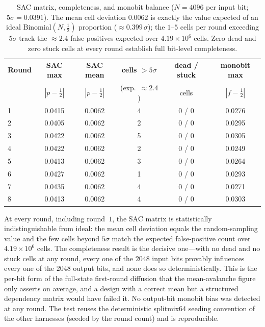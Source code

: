 \documentclass[11pt,a4paper]{article}
\begin{document}
\begin{table}[h]
\centering
\renewcommand{\arraystretch}{1.2}
\begin{tabular}{lccccc}
  \toprule
  \textbf{Round} & \textbf{SAC max} & \textbf{SAC mean} &
  \textbf{cells $>5\sigma$} & \textbf{dead / stuck} & \textbf{monobit max} \\
   & $|p{-}\tfrac12|$ & $|p{-}\tfrac12|$ & (exp.\ ${\approx}2.4$) & cells & $|f{-}\tfrac12|$ \\
  \midrule
  1 & 0.0415 & 0.0062 & 4 & 0 / 0 & 0.0276 \\
  2 & 0.0405 & 0.0062 & 2 & 0 / 0 & 0.0295 \\
  3 & 0.0422 & 0.0062 & 5 & 0 / 0 & 0.0305 \\
  4 & 0.0422 & 0.0062 & 2 & 0 / 0 & 0.0249 \\
  5 & 0.0413 & 0.0062 & 3 & 0 / 0 & 0.0264 \\
  6 & 0.0427 & 0.0062 & 1 & 0 / 0 & 0.0293 \\
  7 & 0.0435 & 0.0062 & 4 & 0 / 0 & 0.0271 \\
  8 & 0.0413 & 0.0062 & 4 & 0 / 0 & 0.0303 \\
  \bottomrule
\end{tabular}
\caption{SAC matrix, completeness, and monobit balance ($N=4096$ per input bit;
$5\sigma=0.0391$). The mean cell deviation $0.0062$ is exactly the value expected
of an ideal $\mathrm{Binomial}(N,\tfrac12)$ proportion ($\approx0.399\,\sigma$);
the $1$--$5$ cells per round exceeding $5\sigma$ track the $\approx2.4$ false
positives expected over $4.19\times10^{6}$ cells. Zero dead and zero stuck cells
at every round establish full bit-level completeness.}
\label{tab:sac}
\end{table}

At every round, including round~$1$, the SAC matrix is statistically
indistinguishable from ideal: the mean cell deviation equals the random-sampling
value and the few cells beyond $5\sigma$ match the expected false-positive count
over $4.19\times10^{6}$ cells. The completeness result is the decisive one---with
no dead and no stuck cells at any round, every one of the $2048$ input bits
provably influences every one of the $2048$ output bits, and none does so
deterministically. This is the per-bit form of the full-state first-round
diffusion that the mean-avalanche figure only asserts on average, and a design
with a correct mean but a structured dependency matrix would have failed it. No
output-bit monobit bias was detected at any round. The test reuses the
deterministic splitmix64 seeding convention of the other harnesses (seeded by
the round count) and is reproducible.
\end{document}
